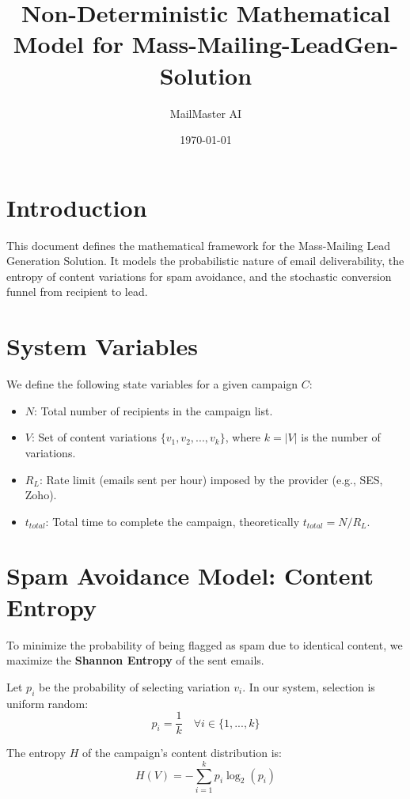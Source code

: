\documentclass{article}
\title{Non-Deterministic Mathematical Model for Mass-Mailing-LeadGen-Solution}
\author{MailMaster AI}
\date{\today}
\begin{document}
\maketitle

\section{Introduction}
This document defines the mathematical framework for the Mass-Mailing Lead Generation Solution. It models the probabilistic nature of email deliverability, the entropy of content variations for spam avoidance, and the stochastic conversion funnel from recipient to lead.

\section{System Variables}
We define the following state variables for a given campaign $C$:

\begin{itemize}
    \item $N$: Total number of recipients in the campaign list.
    \item $V$: Set of content variations $\{v_1, v_2, ..., v_k\}$, where $k = |V|$ is the number of variations.
    \item $R_L$: Rate limit (emails sent per hour) imposed by the provider (e.g., SES, Zoho).
    \item $t_{total}$: Total time to complete the campaign, theoretically $t_{total} = N / R_L$.
\end{itemize}

\section{Spam Avoidance Model: Content Entropy}
To minimize the probability of being flagged as spam due to identical content, we maximize the \textbf{Shannon Entropy} of the sent emails.

Let $p_i$ be the probability of selecting variation $v_i$. In our system, selection is uniform random:
\begin{equation}
    p_i = \frac{1}{k} \quad \forall i \in \{1, ..., k\}
\end{equation}

The entropy $H$ of the campaign's content distribution is:
\begin{equation}
    H(V) = -\sum_{i=1}^{k} p_i \log_2(p_i)
\end{equation}
\end{document}
